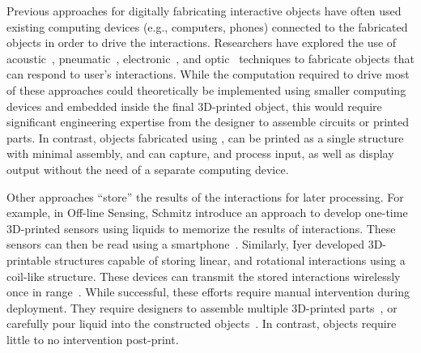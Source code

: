         Previous approaches for digitally fabricating interactive objects
        have often used existing computing devices (e.g., computers,
        phones) connected to the fabricated objects in order to drive the
        interactions. Researchers have explored the use of
        acoustic~\cite{Savage:2015, Tejada:2018, Shi:2016},
        pneumatic~\cite{Tejada:2020, Vazquez:2015, Ou:2016},
        electronic~\cite{Schmitz:2019, Savage:2014,Schmitz:2015}, and
        optic~\cite{Willis:2012, Savage:2013} techniques to fabricate
        objects that can respond to user's interactions. While the
        computation required to drive most of these approaches could
        theoretically be implemented using smaller computing devices and
        embedded inside the final 3D-printed object, this would require
        significant engineering expertise from the designer to assemble
        circuits or printed parts. In contrast, objects fabricated using
        \al, can be printed as a single structure with minimal assembly,
        and can capture, and process input, as well as display output
        without the need of a separate computing device.

        Other approaches ``store'' the results of the interactions for
        later processing. For example, in Off-line Sensing, Schmitz \etal
        introduce an approach to develop one-time 3D-printed sensors using
        liquids to memorize the results of interactions. These sensors can
        then be read using a smartphone~\cite{Schmitz:2018}. Similarly,
        Iyer \etal developed 3D-printable structures capable of storing
        linear, and rotational interactions using a coil-like structure.
        These devices can transmit the stored interactions wirelessly once
        in range~\cite{Iyer:2018}. While successful, these efforts require
        manual intervention during deployment. They require designers to
        assemble multiple 3D-printed parts~\cite{Iyer:2018}, or carefully
        pour liquid into the constructed objects~\cite{Schmitz:2018}. In
        contrast, \al objects require little to no intervention post-print.


